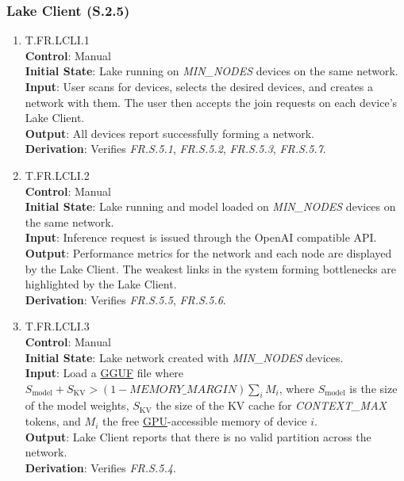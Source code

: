 \documentclass[12pt, titlepage]{article}
\providecommand{\glink}[2]{\hyperlink{gls:#1}{#2}}
\begin{document}
\subsubsection{Lake Client (S.2.5)}\label{subsec:lake-client-system-tests}
\begin{enumerate}
	\item{T.FR.LCLI.1}\label{T.FR.LCLI.1} \\
		\textbf{Control}: Manual \\
		\textbf{Initial State}: Lake running on \textit{MIN\_NODES} devices on the same network. \\
		\textbf{Input}: User scans for devices, selects the desired devices, and creates a network with them.
		The user then accepts the join requests on each device's Lake Client. \\
		\textbf{Output}: All devices report successfully forming a network. \\
		\textbf{Derivation}: Verifies \textit{FR.S.5.1}, \textit{FR.S.5.2}, \textit{FR.S.5.3}, \textit{FR.S.5.7}.
	\item{T.FR.LCLI.2}\label{T.FR.LCLI.2} \\
		\textbf{Control}: Manual \\
		\textbf{Initial State}: Lake running and model loaded on \textit{MIN\_NODES} devices on the same network. \\
		\textbf{Input}: Inference request is issued through the OpenAI compatible API. \\
		\textbf{Output}: Performance metrics for the network and each node are displayed by
		the Lake Client. The weakest links in the system forming bottlenecks are highlighted by the Lake Client. \\
		\textbf{Derivation}: Verifies \textit{FR.S.5.5}, \textit{FR.S.5.6}.
	\item{T.FR.LCLI.3}\label{T.FR.LCLI.3} \\
		\textbf{Control}: Manual \\
		\textbf{Initial State}: Lake network created with \textit{MIN\_NODES} devices. \\
		\textbf{Input}: Load a \glink{gguf}{GGUF} file where $S_{\mathrm{model}} + S_{\mathrm{KV}} >
		(1 - \textit{MEMORY\_MARGIN})\sum_i M_i$, where $S_{\mathrm{model}}$ is the size of the
		model weights, $S_{\mathrm{KV}}$ the size of the KV cache for \textit{CONTEXT\_MAX} tokens, and
		$M_i$ the free \glink{gpu}{GPU}-accessible memory of device $i$. \\
		\textbf{Output}: Lake Client reports that there is no valid partition across the network. \\
		\textbf{Derivation}: Verifies \textit{FR.S.5.4}.
\end{enumerate}
\end{document}
